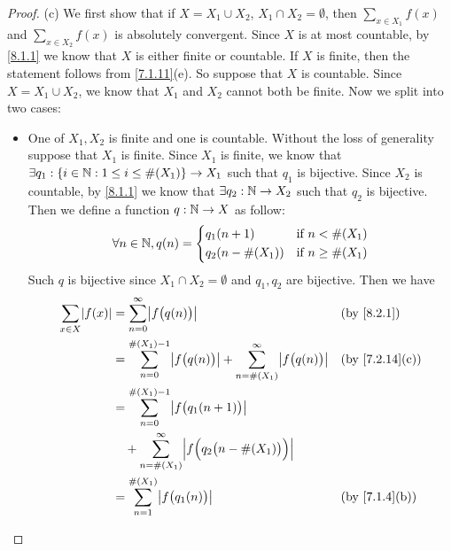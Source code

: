 \begin{proof}{(c)}
  We first show that if \(X = X_1 \cup X_2\), \(X_1 \cap X_2 = \emptyset\), then \(\sum_{x \in X_1} f(x)\) and \(\sum_{x \in X_2} f(x)\) is absolutely convergent.
  Since \(X\) is at most countable, by \cref{8.1.1} we know that \(X\) is either finite or countable.
  If \(X\) is finite, then the statement follows from \cref{7.1.11}(e).
  So suppose that \(X\) is countable.
  Since \(X = X_1 \cup X_2\), we know that \(X_1\) and \(X_2\) cannot both be finite.
  Now we split into two cases:
  \begin{itemize}
    \item One of \(X_1, X_2\) is finite and one is countable.
          Without the loss of generality suppose that \(X_1\) is finite.
          Since \(X_1\) is finite, we know that \(\exists q_1 : \{i \in \mathbb{N} : 1 \leq i \leq \#(X_1)\} \to X_1\) such that \(q_1\) is bijective.
          Since \(X_2\) is countable, by \cref{8.1.1} we know that \(\exists q_2 : \mathbb{N} \to X_2\) such that \(q_2\) is bijective.
          Then we define a function \(q : \mathbb{N} \to X\) as follow:
          \[
            \forall n \in \mathbb{N}, q(n) = \begin{dcases}
              q_1(n + 1)       & \text{if } n < \#(X_1)    \\
              q_2(n - \#(X_1)) & \text{if } n \geq \#(X_1)
            \end{dcases}
          \]
          Such \(q\) is bijective since \(X_1 \cap X_2 = \emptyset\) and \(q_1, q_2\) are bijective.
          Then we have
          \begin{align*}
            \sum_{x \in X} \abs{f(x)} & = \sum_{n = 0}^\infty \abs{f\big(q(n)\big)}                                                          &  & \by{8.2.1}                   \\
                                      & = \sum_{n = 0}^{\#(X_1) - 1} \abs{f\big(q(n)\big)} + \sum_{n = \#(X_1)}^\infty \abs{f\big(q(n)\big)} &  & \text{(by \cref{7.2.14}(c))} \\
                                      & = \sum_{n = 0}^{\#(X_1) - 1} \abs{f\big(q_1(n + 1)\big)}                                                                               \\
                                      & \quad + \sum_{n = \#(X_1)}^\infty \abs{f\Big(q_2\big(n - \#(X_1)\big)\Big)}                                                            \\
                                      & = \sum_{n = 1}^{\#(X_1)} \abs{f\big(q_1(n)\big)}                                                     &  & \text{(by \cref{7.1.4}(b))}  \\

\end{align*}
\end{itemize}
\end{proof}
